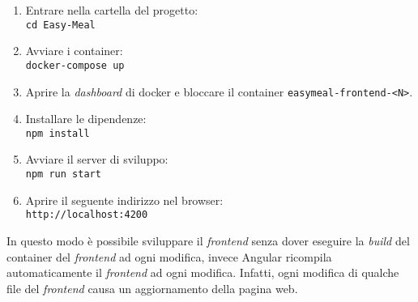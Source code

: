 \begin{enumerate}
	\item Entrare nella cartella del progetto: \\
		\texttt{cd Easy-Meal}

	\item Avviare i container: \\
		\texttt{docker-compose up}

	\item Aprire la \textit{dashboard} di docker e bloccare il container
		\texttt{easymeal-frontend-<N>}.

	\item Installare le dipendenze: \\
		\texttt{npm install}

	\item Avviare il server di sviluppo: \\
		\texttt{npm run start}

	\item Aprire il seguente indirizzo nel browser: \\
		\texttt{http://localhost:4200}
\end{enumerate}

In questo modo è possibile sviluppare il \textit{frontend} senza dover eseguire
la \textit{build} del container del \textit{frontend} ad ogni modifica, invece
Angular ricompila automaticamente il \textit{frontend} ad ogni modifica.
Infatti, ogni modifica di qualche file del \textit{frontend} causa un 
aggiornamento della pagina web.
